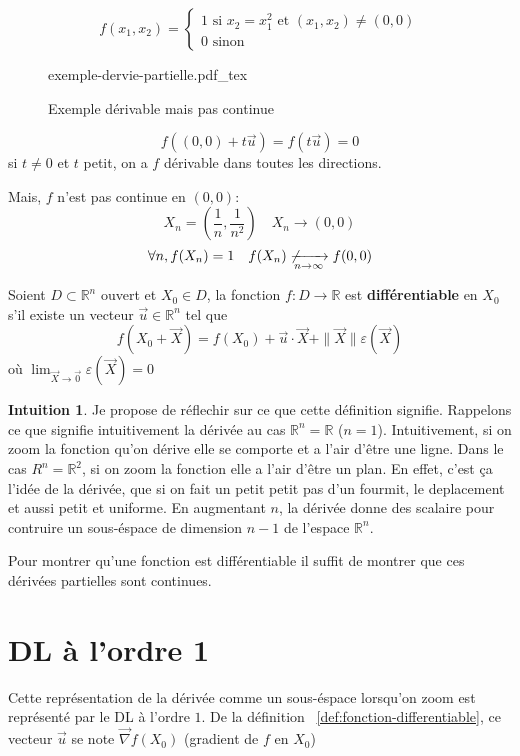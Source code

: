 \documentclass[a4paper]{report}
\newcommand\R{\ensuremath{\mathbb{R}}}
\let\epsilon\varepsilon
\theoremstyle{definition}
\newtheorem*{intuition}{Intuition}
\newcommand{\incfig}[1]{%
    \def\svgwidth{\columnwidth}
    {#1.pdf_tex}
}
\begin{document}
\begin{eg}
   \[
   f(x_1, x_2) = \begin{cases}
       1  \text{ si } x_2 = x_1^2 \text{ et } (x_1, x_2) \neq (0, 0)\\
       0 \text{ sinon}
   \end{cases}
   \]  
\begin{figure}[H]
    \centering
    \incfig{exemple-dervie-partielle}
    \caption{Exemple dérivable mais pas continue}
    \label{fig:exemple-dervie-partielle}
\end{figure}
\[
    f((0, 0) + t \vec{u}) = f(t \vec{u}) = 0
\] 
si $t\neq 0$ et $t$ petit, on a $f$ dérivable dans toutes les directions.
\par
Mais, $f$ n'est pas continue en  $(0, 0)$:
 \[
X_n = (\frac{1}{n}, \frac{1}{n^2}) \quad X_n \to (0, 0)
\] 
\[
\forall n, f(X_n) = 1 \quad f(X_n) \not\xrightarrow[n \to \infty]{} f(0, 0)
\] 
\end{eg}

\begin{definition}\label{def:fonction-differentiable}
    Soient $D \subset \R^n$ ouvert et $X_0 \in D$, la fonction
    $f: D \to \R$
    est \textbf{différentiable} en $X_0$ s'il existe un vecteur $\vec{u} \in \R^n$ tel que 
    \[
        f(X_0 + \vec{X}) = f(X_0) + \vec{u} \cdot \vec{X} + \|\vec{X}\|\epsilon(\vec{X})
    \] 
    où $\lim_{\vec{X} \to \vec{0}} \epsilon(\vec{X}) = 0$
\end{definition}
\begin{intuition}
   Je propose de réflechir sur ce que cette définition signifie. 
   Rappelons ce que signifie intuitivement la dérivée au cas $\R^n = \R$ ($n = 1$). 
   Intuitivement, si on zoom la fonction qu'on dérive elle se comporte et a l'air d'être une ligne. 
   Dans le cas $R^n = \R^2$, si on zoom la fonction elle a l'air d'être un plan. 
   En effet, c'est ça l'idée de la dérivée, que si on fait un petit petit pas d'un fourmit, le deplacement et aussi petit et uniforme. 
   En augmentant $n$, la dérivée donne des scalaire pour contruire un sous-éspace de dimension $n-1$ de l'espace $\R^n$. 
\end{intuition}
\begin{note}
   Pour montrer qu'une fonction est différentiable il suffit de montrer que ces dérivées partielles sont continues. 
\end{note}

\section{DL à l'ordre 1}
Cette représentation de la dérivée comme un sous-éspace lorsqu'on zoom est représenté par le DL à l'ordre $1$.
De la définition ~\ref{def:fonction-differentiable}, ce vecteur $\vec{u}$ se note $\vec{\nabla}f(X_0)$ (gradient de $f$ en  $X_0$)
\end{document}
